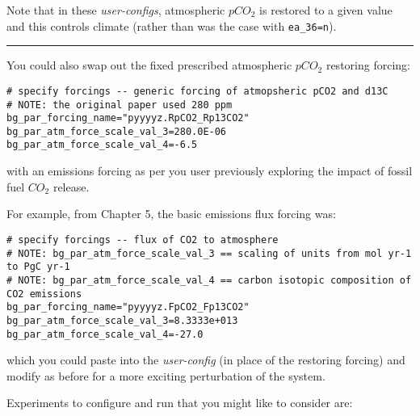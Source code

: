 Note that in these \textit{user-configs}, atmospheric \(pCO_{2}\) is restored to a given value and this controls climate (rather than was the case with \texttt{\small ea\_36=n}).

\vspace{1mm} \noindent\rule{4cm}{0.1mm} \vspace{2mm}

\newpage

\noindent You could also swap out the fixed prescribed atmospheric \(pCO_{2}\) restoring forcing:
\vspace{-2mm}\small\begin{verbatim}
# specify forcings -- generic forcing of atmopsheric pCO2 and d13C
# NOTE: the original paper used 280 ppm
bg_par_forcing_name="pyyyyz.RpCO2_Rp13CO2"
bg_par_atm_force_scale_val_3=280.0E-06
bg_par_atm_force_scale_val_4=-6.5
\end{verbatim}\normalsize\vspace{-2mm}
with an emissions forcing as per you user previously exploring the impact of fossil fuel $CO_{2}$ release. 

\vspace{1mm}
For example, from Chapter 5, the basic emissions flux forcing was:
\vspace{-2mm}\small\begin{verbatim}
# specify forcings -- flux of CO2 to atmosphere
# NOTE: bg_par_atm_force_scale_val_3 == scaling of units from mol yr-1 to PgC yr-1
# NOTE: bg_par_atm_force_scale_val_4 == carbon isotopic composition of CO2 emissions
bg_par_forcing_name="pyyyyz.FpCO2_Fp13CO2"
bg_par_atm_force_scale_val_3=8.3333e+013
bg_par_atm_force_scale_val_4=-27.0
\end{verbatim}\normalsize\vspace{-2mm}
which you could paste into the \textit{user-config} (in place of the restoring forcing) and modify as before for a more exciting perturbation of the system.

\vspace{2mm}
\noindent Experiments to configure and run that you might like to consider are:

